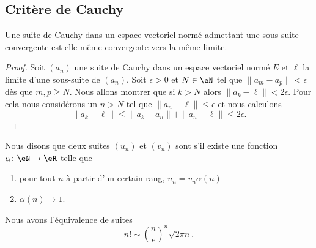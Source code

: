 \subsection{Critère de Cauchy}

\begin{lemma}
    Une suite de Cauchy dans un espace vectoriel normé admettant une sous-suite convergente est elle-même convergente vers la même limite.
\end{lemma}

\begin{proof}
    Soit \( (a_n)\) une suite de Cauchy dans un espace vectoriel normé \( E\) et \( \ell\) la limite d'une sous-suite de \( (a_n)\). Soit \( \epsilon>0\) et \( N\in \eN\) tel que \( \| a_m-a_p \|<\epsilon\) dès que \( m,p\geq N\). Nous allons montrer que si \( k>N\) alors \( \| a_k-\ell \|<2\epsilon\). Pour cela nous considérons un \( n>N\) tel que \( \| a_n-\ell \|\leq \epsilon\) et nous calculons
    \begin{equation}
        \| a_k-\ell \|\leq \| a_k-a_n \|+\| a_n-\ell \|\leq 2\epsilon.
    \end{equation}
\end{proof}

\begin{definition}      \label{DEFooEWRTooKgShmT}
    Nous disons que deux suites \( (u_n)\) et \( (v_n)\) sont  s'il existe une fonction \( \alpha\colon \eN\to \eR\) telle que
    \begin{enumerate}
        \item
            pour tout \( n\) à partir d'un certain rang, \( u_n=v_n\alpha(n)\)
        \item
            \( \alpha(n)\to 1\).
    \end{enumerate}
\end{definition}

\begin{lemma}        \label{LemCEoBqrP}
    Nous avons l'équivalence de suites
    \begin{equation}
        n!\sim \left( \frac{ n }{ e } \right)^n\sqrt{2\pi n}.
    \end{equation}
\end{lemma}

